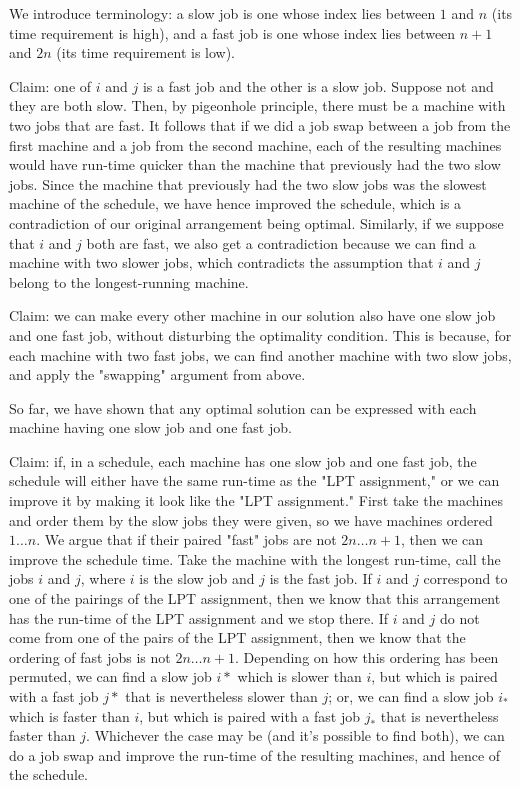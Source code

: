 \documentclass{article}[11pt]
\begin{document}
We introduce terminology: a slow job is one whose index lies between $1$ and $n$ (its time requirement is high), and a fast job is one whose index lies between $n+1$ and $2n$ (its time requirement is low).

Claim: one of $i$ and $j$ is a fast job and the other is a slow job. Suppose not and they are both slow. Then, by pigeonhole principle, there must be a machine with two jobs that are fast. It follows that if we did a job swap between a job from the first machine and a job from the second machine, each of the resulting machines would have run-time quicker than the machine that previously had the two slow jobs. Since the machine that previously had the two slow jobs was the slowest machine of the schedule, we have hence improved the schedule, which is a contradiction of our original arrangement being optimal. Similarly, if we suppose that $i$ and $j$ both are fast, we also get a contradiction because we can find a machine with two slower jobs, which contradicts the assumption that $i$ and $j$ belong to the longest-running machine.

Claim: we can make every other machine in our solution also have one slow job and one fast job, without disturbing the optimality condition. This is because, for each machine with two fast jobs, we can find another machine with two slow jobs, and apply the "swapping" argument from above. 

So far, we have shown that any optimal solution can be expressed with each machine having one slow job and one fast job.

Claim: if, in a schedule, each machine has one slow job and one fast job, the schedule will either have the same run-time as the "LPT assignment," or we can improve it by making it look like the "LPT assignment." First take the machines and order them by the slow jobs they were given, so we have machines ordered $1 \ldots n$. We argue that if their paired "fast" jobs are not $2n \ldots n+1$, then we can improve the schedule time. Take the machine with the longest run-time, call the jobs $i$ and $j$, where $i$ is the slow job and $j$ is the fast job. If $i$ and $j$ correspond to one of the pairings of the LPT assignment, then we know that this arrangement has the run-time of the LPT assignment and we stop there. If $i$ and $j$ do not come from one of the pairs of the LPT assignment, then we know that the ordering of fast jobs is not $2n \ldots n+1$. Depending on how this ordering has been permuted, we can find a slow job $i*$ which is slower than $i$, but which is paired with a fast job $j*$ that is nevertheless slower than $j$; or, we can find a slow job $i_*$ which is faster than $i$, but which is paired with a fast job $j_*$ that is nevertheless faster than $j$. Whichever the case may be (and it's possible to find both), we can do a job swap and improve the run-time of the resulting machines, and hence of the schedule.
\end{document}
